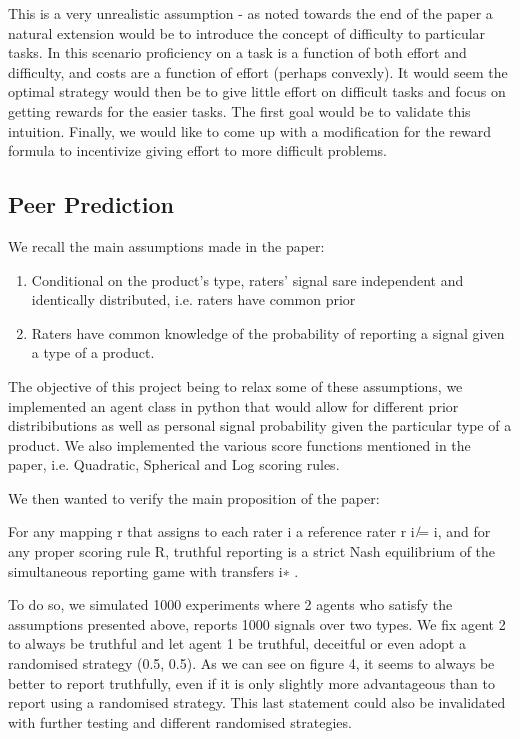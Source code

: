 \documentclass{scrartcl}
\begin{document}
This is a very unrealistic assumption - as noted towards the end of the paper a natural extension would be to introduce the concept of difficulty to particular tasks. In this scenario proficiency on a task is a function of both effort and difficulty, and costs are a function of effort (perhaps convexly). It would seem the optimal strategy would then be to give little effort on difficult tasks and focus on getting rewards for the easier tasks. The first goal would be to validate this intuition. Finally, we would like to come up with a modification for the reward formula to incentivize giving effort to more difficult problems.

\subsection{Peer Prediction}

We recall the main assumptions made in the paper:

\begin{enumerate}
\item Conditional on the product’s type, raters’ signal sare independent and identically distributed, i.e. raters have common prior
\item Raters have common knowledge of the probability of reporting a signal given a type of a product.
\end{enumerate}

The objective of this project being to relax some of these assumptions, we implemented an agent class in python that would allow for different prior distribibutions as well as personal signal probability given the particular type of a product. We also implemented the various score functions mentioned in the paper, i.e. Quadratic, Spherical and Log scoring rules.

We then wanted to verify the main proposition of the paper:

\begin{displayquote}
For any mapping r that assigns to each rater i a reference rater r i  ̸= i, and for any proper scoring rule R, truthful reporting is a strict Nash equilibrium of the simultaneous reporting game with transfers  i∗ .
\end{displayquote}

To do so, we simulated 1000 experiments where 2 agents who satisfy the assumptions presented above, reports 1000 signals over two types. We fix agent 2 to always be truthful and let agent 1 be truthful, deceitful or even adopt a randomised strategy (0.5, 0.5). As we can see on figure 4, it seems to always be better to report truthfully, even if it is only slightly more advantageous than to report using a randomised strategy. This last statement could also be invalidated with further testing and different randomised strategies.\\
\end{document}
